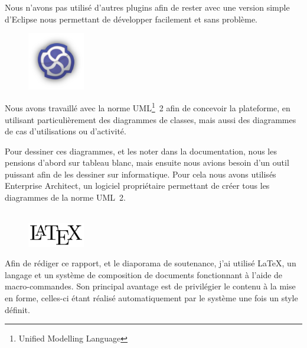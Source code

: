 Nous n’avons pas utilisé d’autres plugins afin de rester avec une version simple d’Eclipse nous permettant de développer facilement et sans problème.

\begin{figure}
	\includegraphics[width=2.5cm]{contents/images/logoEnterpriseArchitect.png}
\end{figure}
Nous avons travaillé avec la norme UML\footnote{Unified Modelling Language}~2 afin de concevoir la plateforme, en utilisant particulièrement des diagrammes de classes, mais aussi des diagrammes de cas d'utilisations ou d'activité. 

Pour dessiner ces diagrammes, et les noter dans la documentation, nous les pensions d'abord sur tableau blanc, mais ensuite nous avions besoin d'un outil puissant afin de les dessiner sur informatique. Pour cela nous avons utilisés Enterprise Architect, un logiciel propriétaire permettant de créer tous les diagrammes de la norme UML~2.\\~

\begin{figure}
	\includegraphics[width=2.5cm]{contents/images/logoLatex.png}
\end{figure}
Afin de rédiger ce rapport, et le diaporama de soutenance, j'ai utilisé \LaTeX{}, un langage et un système de composition de documents fonctionnant à l'aide de macro-commandes. Son principal avantage est de privilégier le contenu à la mise en forme, celles-ci étant réalisé automatiquement par le système une fois un style définit. 
